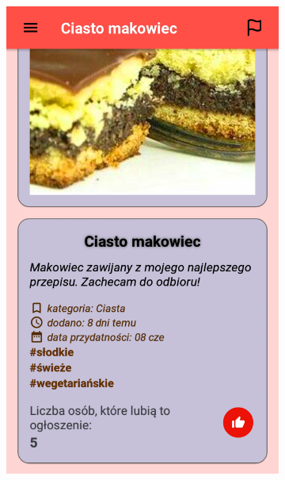 \documentclass[licencjacka]{pracamgr}
\begin{document}
\begin{figure}[H]
\begin{subfigure}[b]{0.4\linewidth}
\begin{framed}
      \includegraphics[width=\linewidth]{szczegoly1.png}
    \end{framed}
  \end{subfigure}
  \begin{subfigure}[b]{0.4\linewidth}
    \begin{framed}

\end{framed}
\end{subfigure}
\end{figure}
\end{document}
